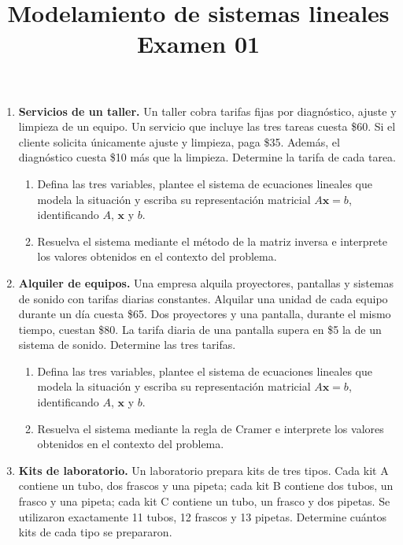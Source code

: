 \documentclass[11pt,a4paper]{article}
\title{\textbf{Modelamiento de sistemas lineales\\Examen 01}}
\author{}
\date{}
\begin{document}
\maketitle
\begin{enumerate}
\item \textbf{Servicios de un taller.} Un taller cobra tarifas fijas por diagnóstico, ajuste y limpieza de un equipo. Un servicio que incluye las tres tareas cuesta \$60. Si el cliente solicita únicamente ajuste y limpieza, paga \$35. Además, el diagnóstico cuesta \$10 más que la limpieza. Determine la tarifa de cada tarea.

\begin{enumerate}
    \item Defina las tres variables, plantee el sistema de ecuaciones lineales que modela la situación y escriba su representación matricial $A\mathbf{x}=b$, identificando $A$, $\mathbf{x}$ y $b$.
    \item Resuelva el sistema mediante el método de la matriz inversa e interprete los valores obtenidos en el contexto del problema.
\end{enumerate}
\item \textbf{Alquiler de equipos.} Una empresa alquila proyectores, pantallas y sistemas de sonido con tarifas diarias constantes. Alquilar una unidad de cada equipo durante un día cuesta \$65. Dos proyectores y una pantalla, durante el mismo tiempo, cuestan \$80. La tarifa diaria de una pantalla supera en \$5 la de un sistema de sonido. Determine las tres tarifas.

\begin{enumerate}
    \item Defina las tres variables, plantee el sistema de ecuaciones lineales que modela la situación y escriba su representación matricial $A\mathbf{x}=b$, identificando $A$, $\mathbf{x}$ y $b$.
    \item Resuelva el sistema mediante la regla de Cramer e interprete los valores obtenidos en el contexto del problema.
\end{enumerate}
\item \textbf{Kits de laboratorio.} Un laboratorio prepara kits de tres tipos. Cada kit A contiene un tubo, dos frascos y una pipeta; cada kit B contiene dos tubos, un frasco y una pipeta; cada kit C contiene un tubo, un frasco y dos pipetas. Se utilizaron exactamente 11 tubos, 12 frascos y 13 pipetas. Determine cuántos kits de cada tipo se prepararon.


\end{enumerate}
\end{document}
